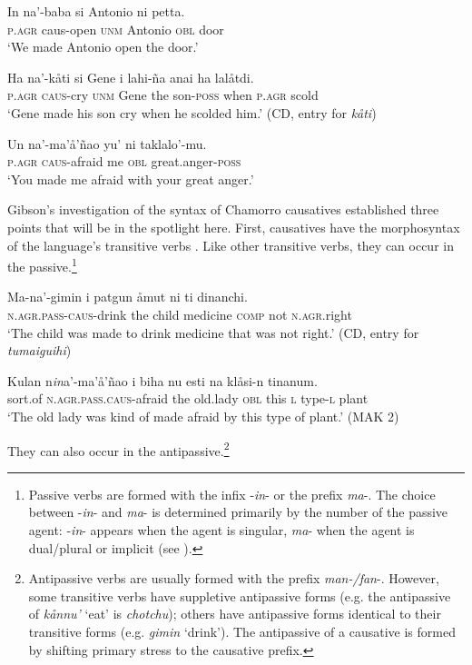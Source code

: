 \documentclass[output=paper,
modfonts
]{LSP/langsci}
\begin{document}
\begin{exe}
\begin{xlist}
\ea
\ea
\gll In na'-baba si Antonio ni petta.\\
\textsc{p.agr} {caus-}open \textsc{unm} Antonio \textsc{obl} door\\
\glt `We made Antonio open the door.'

\ex \gll Ha na'-kåti si Gene i lahi-ña anai ha lalåtdi.\\
\textsc{p.agr} \textsc{caus-}cry \textsc{unm} Gene the son-\textsc{poss} when \textsc{p.agr } scold\\
\glt `Gene made his son cry when he scolded him.' (CD, entry for \emph{kåti})

\ex \gll Un na'-ma'å'ñao yu' ni taklalo'-mu.\\
\textsc{p.agr} \textsc{caus-}afraid me \textsc{obl} great.anger-\textsc{poss}\\
\glt `You made me afraid with your great anger.'
\z
\z

Gibson's \citeyear{gibson1980} investigation of the syntax of Chamorro causatives
established three points that will be in the spotlight here. First,
causatives have the morphosyntax of the language's transitive verbs
\citep[86--91]{gibson1980}. Like other transitive verbs, they can occur in the
passive.\footnote{Passive verbs are formed with the infix -\emph{in}- or
  the prefix \emph{ma}-. The choice between -\emph{in}- and \emph{ma}-
  is determined primarily by the number of the passive agent:
  -\emph{in}- appears when the agent is singular, \emph{ma}- when the
  agent is dual/plural or implicit (see \citealt[38, note 8]{chung1998}).}

\begin{exe}
\ex
\begin{xlist}
\ex
\gll Ma-na'-gimin i patgun åmut ni ti dinanchi.\\
\textsc{n.agr.pass}-\textsc{caus-}drink the child medicine \textsc{comp} not \textsc{n.agr.}right\\
\glt `The child was made to drink medicine that was not right.' (CD, entry for \emph{tumaiguihi})

\ex \gll Kulan n\emph{in}a'-ma'å'ñao i biha nu esti na klåsi-n tinanum.\\
sort.of \textsc{n.agr.pass.caus-}afraid the old.lady \textsc{obl} this \textsc{l} type-\textsc{l} plant\\
\glt `The old lady was kind of made afraid by this type of plant.' (MAK 2)
\end{xlist}
\end{exe}

They can also occur in the antipassive.\footnote{Antipassive verbs are
  usually formed with the prefix \emph{man-/fan}-. However, some
  transitive verbs have suppletive antipassive forms (e.g. the
  antipassive of \emph{kånnu'} `eat' is \emph{chotchu}); others have
  antipassive forms identical to their transitive forms (e.g.
  \emph{gimin} `drink'). The antipassive of a causative is formed by
  shifting primary stress to the causative prefix.}


\end{xlist}
\end{exe}
\end{document}
